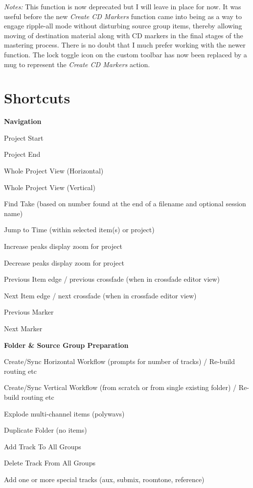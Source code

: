 \documentclass[10pt,american]{article}
\newenvironment{lyxlist}[1]
	{\begin{list}{} {\settowidth{\labelwidth}{#1}
		 \setlength{\leftmargin}{\labelwidth}
		 \addtolength{\leftmargin}{\labelsep}
		 \renewcommand{\makelabel}[1]{##1\hfil}}} {\end{list}}
\begin{document}
\emph{Notes:} This function is now deprecated but I will leave in place for now.
It was useful before the new \emph{Create CD Markers} function came into being
as a way to engage ripple-all mode without disturbing source group items,
thereby allowing moving of destination material along with CD markers in the
final stages of the mastering process. There is no doubt that I much prefer
working with the newer function. The lock toggle icon on the custom toolbar has
now been replaced by a mug to represent the \emph{Create CD Markers}
action.\pagebreak{}

\section{Shortcuts}

\textbf{Navigation}
\begin{lyxlist}{00.00.0000}
\item [{\keys{Home}}] Project Start 
\item [{\keys{End}}] Project End 
\item [{\keys{`}}] Whole Project View (Horizontal)
\item [{\keys{\ctrl+`}}] Whole Project View (Vertical)
\item [{\keys{\return}}] Find Take (based on number found at the end of a
filename and optional session name)
\item [{\keys{\tab}}] Jump to Time (within selected item(s) or project)
\item [{\keys{\ctrl+\arrowkeyup}}] Increase peaks display zoom for project
\item [{\keys{\ctrl+\arrowkeydown}}] Decrease peaks display zoom for project
\item [{\keys{Q}}] Previous Item edge / previous crossfade (when in crossfade
editor view)
\item [{\keys{W}}] Next Item edge / next crossfade (when in crossfade editor
view)
\item [{\keys{,}}] Previous Marker 
\item [{\keys{.}}] Next Marker
\end{lyxlist}
\textbf{Folder \& Source Group Preparation}
\begin{lyxlist}{00.00.0000}
\item [{\keys{F7}}] Create/Sync Horizontal Workflow (prompts for number of
tracks) / Re-build routing etc
\item [{\keys{F8}}] Create/Sync Vertical Workflow (from scratch or from single
existing folder) / Re-build routing etc
\item [{\keys{F10}}] Explode multi-channel items (polywavs)
\item [{\keys{\textbackslash}}] Duplicate Folder (no items)
\item [{\keys{\shift+T}}] Add Track To All Groups
\item [{\keys{\ctrl+\shift+\del}}] Delete Track From All Groups
\item [{\keys{\#}}] Add one or more special tracks (aux, submix, roomtone,
reference)
\end{lyxlist}
\end{document}
